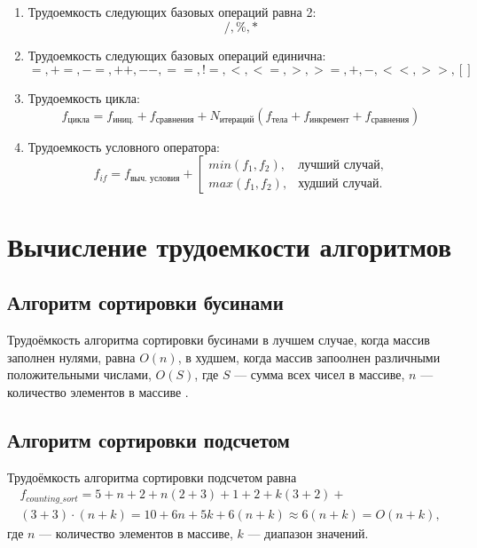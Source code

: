 \begin{enumerate}
	\item Трудоемкость следующих базовых операций равна 2:
		\begin{equation}
			/, \%, * 
		\end{equation}
	\item Трудоемкость следующих базовых операций единична:
		\begin{equation}
			=, +=, -=, ++, --, ==, !=, <, <=, >, >=, +, -, <<, >>, []
		\end{equation}
	\item Трудоемкость цикла:
	\begin{equation}
	f_{\text{цикла}} = f_{\text{иниц.}} + f_{\text{сравнения}} + N_{\text{итераций}}(f_{\text{тела}} + f_{\text{инкремент}} + f_{\text{сравнения}})
	\end{equation}
	\item Трудоемкость условного оператора:
	\begin{equation}
		f_{if} = f_{\text{выч. условия}} +
		\left[
		\begin{array}{cc}
		min(f_1, f_2), &\text{лучший случай,}\\
		max(f_1, f_2), &\text{худший случай.}
		\end{array}
		\right.
	\end{equation}
\end{enumerate}

\section{Вычисление трудоемкости алгоритмов}

\subsection{Алгоритм сортировки бусинами}

Трудоёмкость алгоритма сортировки бусинами в лучшем случае, когда массив заполнен нулями, равна $O(n)$, в худшем, когда массив запоолнен различными положительными числами, $O(S)$, где $S$ --- сумма всех чисел в массиве, $n$ --- количество элементов в массиве \cite{bead_sort}.

\subsection{Алгоритм сортировки подсчетом}

Трудоёмкость алгоритма сортировки подсчетом равна
\begin{equation}
	\label{for:counting_sort}
	\begin{array}{c}
	f_{counting\_sort} = 5 + n + 2 + n(2 + 3) + 1 + 2 + k(3 + 2) + \\(3 + 3) \cdot (n + k) = 10 + 6n + 5k + 6(n + k) \approx 6(n + k) = O(n + k),
	\end{array}
\end{equation}
где $n$ --- количество элементов в массиве, $k$ --- диапазон значений.

